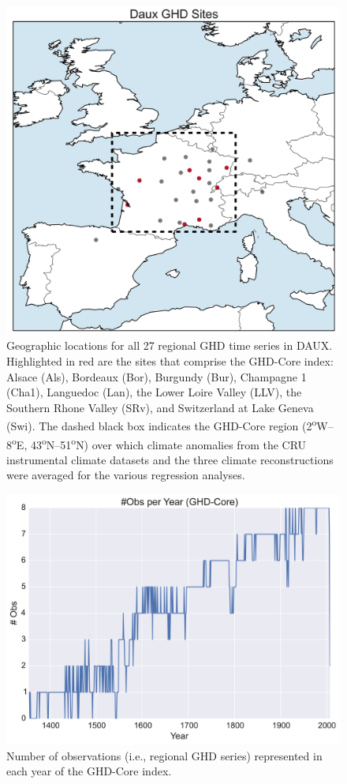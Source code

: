 \documentclass[12pt]{article}
\begin{document}
\begin{figure}
\center
\includegraphics[width=1.0\columnwidth,scale=2]{SUPP_fig_01_map_sites.png}
\caption{Geographic locations for all 27 regional GHD time series in DAUX. Highlighted in red are the sites that comprise the GHD-Core index: Alsace (Als), Bordeaux (Bor), Burgundy (Bur), Champagne 1 (Cha1), Languedoc (Lan), the Lower Loire Valley (LLV), the Southern Rhone Valley (SRv), and Switzerland at Lake Geneva (Swi). The dashed black box indicates the GHD-Core region (2\textsuperscript{o}W--8\textsuperscript{o}E, 43\textsuperscript{o}N--51\textsuperscript{o}N) over which climate anomalies from the CRU instrumental climate datasets and the three climate reconstructions were averaged for the various regression analyses.}
\end{figure}

\begin{figure}
\center
\includegraphics[width=1.0\columnwidth,scale=2]{SUPP_fig_02_numobs.png}
\caption{Number of observations (i.e., regional GHD series) represented in each year of the GHD-Core index.}
\end{figure}
\end{document}
